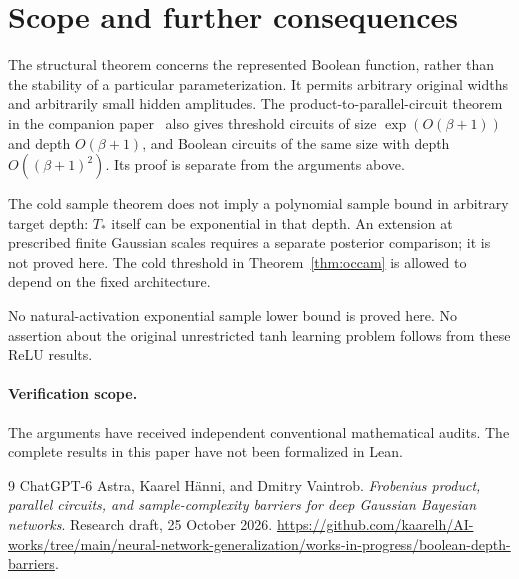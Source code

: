 \documentclass[11pt]{article}
\theoremstyle{remark}\newtheorem{remark}[theorem]{Remark}
\begin{document}
\section{Scope and further consequences}
The structural theorem concerns the represented Boolean function, rather
than the stability of a particular parameterization. It permits arbitrary
original widths and arbitrarily small hidden amplitudes.
The product-to-parallel-circuit theorem in the companion
paper~\cite{parallel} also gives threshold circuits of size $\exp(O(\beta+1))$ and depth
$O(\beta+1)$, and Boolean circuits of the same size with depth
$O((\beta+1)^2)$. Its proof is separate from the arguments above.

The cold sample theorem does not imply a polynomial sample bound in
arbitrary target depth: $T_*$ itself can be exponential in that depth.
An extension at prescribed finite Gaussian scales requires a separate
posterior comparison; it is not proved here. The cold threshold in
Theorem~\ref{thm:occam} is allowed to depend on the fixed architecture.

No natural-activation exponential sample lower bound is proved here.
No assertion about the original unrestricted tanh learning problem
follows from these ReLU results.
\paragraph{Verification scope.}
The arguments have received independent conventional mathematical audits.
The complete results in this paper have not been formalized in Lean.

\begin{thebibliography}{9}
ChatGPT-6 Astra, Kaarel H\"anni, and Dmitry Vaintrob.
\emph{Frobenius product, parallel circuits, and sample-complexity barriers
for deep Gaussian Bayesian networks}. Research draft, 25 October 2026.
\url{https://github.com/kaarelh/AI-works/tree/main/neural-network-generalization/works-in-progress/boolean-depth-barriers}.
\end{thebibliography}
\end{document}
